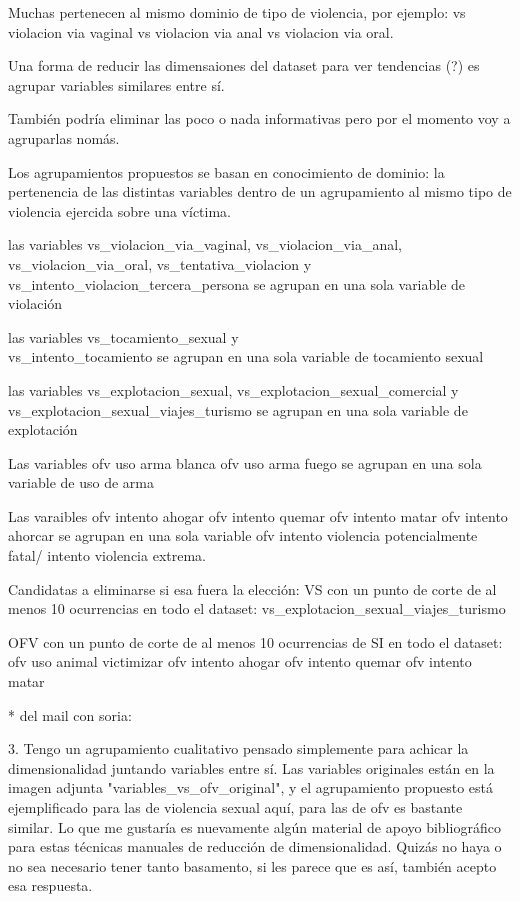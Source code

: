 \documentclass[10pt, spanish]{article}
\begin{document}
Muchas pertenecen al mismo dominio de tipo de violencia, por ejemplo: vs violacion via vaginal vs violacion via anal vs violacion via oral.

Una forma de reducir las dimensaiones del dataset para ver tendencias (?)  es agrupar variables similares entre sí.

También podría eliminar las poco o nada informativas pero por el momento voy a agruparlas nomás.

Los agrupamientos propuestos se basan en conocimiento de dominio: la pertenencia de las distintas variables dentro de un agrupamiento al mismo tipo de violencia ejercida sobre una víctima.




las variables vs\_violacion\_via\_vaginal,  vs\_violacion\_via\_anal,  vs\_violacion\_via\_oral, vs\_tentativa\_violacion y vs\_intento\_violacion\_tercera\_persona se agrupan en una sola variable de violación

las variables vs\_tocamiento\_sexual y \\ vs\_intento\_tocamiento se agrupan en una sola variable de tocamiento sexual



las variables vs\_explotacion\_sexual,  vs\_explotacion\_sexual\_comercial y vs\_explotacion\_sexual\_viajes\_turismo se agrupan en una sola variable de explotación


Las variables ofv uso arma blanca ofv uso arma fuego se agrupan en una sola variable de uso de arma

Las varaibles ofv intento ahogar ofv intento quemar 
ofv intento matar ofv intento ahorcar se agrupan en una sola variable ofv intento violencia potencialmente fatal/ intento violencia extrema.

Candidatas a eliminarse si esa fuera la elección: VS con un punto de corte de al menos 10 ocurrencias en todo el dataset: vs\_explotacion\_sexual\_viajes\_turismo



OFV con un punto de corte de al menos 10 ocurrencias de SI en todo el dataset: ofv uso animal victimizar
ofv intento ahogar
ofv intento quemar 
ofv intento matar


* del mail con soria:

3. Tengo un agrupamiento cualitativo pensado simplemente para achicar la dimensionalidad juntando variables entre sí. Las variables originales están en la imagen adjunta "variables\_vs\_ofv\_original", y el agrupamiento propuesto está ejemplificado para las de violencia sexual aquí, para las de ofv es bastante similar. Lo que me gustaría es nuevamente algún material de apoyo bibliográfico para estas técnicas manuales de reducción de dimensionalidad. Quizás no haya o no sea necesario tener tanto basamento, si les parece que es así, también acepto esa respuesta.
\end{document}
